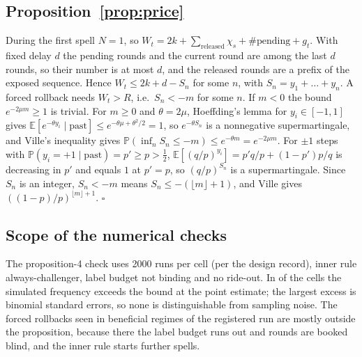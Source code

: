 \documentclass{article}
\theoremstyle{plain}
\theoremstyle{definition}
\newcommand{\PP}{\mathbb{P}}
\newcommand{\E}{\mathbb{E}}
\begin{document}
\subsection{Proposition~\ref{prop:price}}
During the first spell $N=1$, so $W_t=2k+\sum_{\text{released}}\chi_s+\#\text{pending}+g_t$. With fixed delay $d$ the pending rounds and the current round are among the last $d$ rounds, so their number is at most $d$, and the released rounds are a prefix of the exposed sequence. Hence $W_t\le2k+d-S_n$ for some $n$, with $S_n=y_1+\dots+y_n$. A forced rollback needs $W_t>R$, i.e.\ $S_n<-m$ for some $n$. If $m<0$ the bound $e^{-2\mu m}\ge1$ is trivial. For $m\ge0$ and $\theta=2\mu$, Hoeffding's lemma for $y_i\in[-1,1]$ gives $\E[e^{-\theta y_i}\mid\text{past}]\le e^{-\theta\mu+\theta^2/2}=1$, so $e^{-\theta S_n}$ is a nonnegative supermartingale, and Ville's inequality gives $\PP(\inf_nS_n\le-m)\le e^{-\theta m}=e^{-2\mu m}$. For $\pm1$ steps with $\PP(y_i=+1\mid\text{past})=p'\ge p>\frac12$, $\E[(q/p)^{y_i}]=p'q/p+(1-p')p/q$ is decreasing in $p'$ and equals $1$ at $p'=p$, so $(q/p)^{S_n}$ is a supermartingale. Since $S_n$ is an integer, $S_n<-m$ means $S_n\le-(\lfloor m\rfloor+1)$, and Ville gives $((1-p)/p)^{\lfloor m\rfloor+1}$. $\square$

\subsection{Scope of the numerical checks}
The proposition-4 check uses 2000 runs per cell (per the design record), inner rule always-challenger, label budget not binding and no ride-out. In \PFourAbove{} of the \PFourCells{} cells the simulated frequency exceeds the bound at the point estimate; the largest excess is \PFourMaxZ{} binomial standard errors, so none is distinguishable from sampling noise. The forced rollbacks seen in beneficial regimes of the registered run are mostly outside the proposition, because there the label budget runs out and rounds are booked blind, and the inner rule starts further spells.
\end{document}
